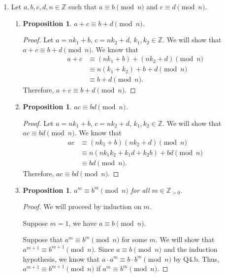 \documentclass{article}
\newtheorem{prop}[thm]{Proposition}
\begin{document}
\begin{enumerate}
\item 
Let $a,b,c,d,n \in \mathbb{Z}$ such that $a \equiv b \pmod{n}$ and $c \equiv d \pmod{n}$.
\begin{enumerate}
\item 
\begin{prop}
     $a + c \equiv b + d \pmod{n}$.
\end{prop}
\begin{proof}
    Let $a = nk_1 + b$, $c = nk_2 + d$, $k_1, k_2 \in \mathbb{Z}$. We will show that $a + c \equiv b + d \pmod{n}$. We know that 
    \begin{align}
        a + c &\equiv (nk_1 + b) + (nk_2 + d) \pmod{n} \\
              &\equiv n(k_1 + k_2) + b + d \pmod{n} \\
              &\equiv b + d \pmod{n}.
    \end{align}
    Therefore, $a + c \equiv b + d \pmod{n}$.
\end{proof}

\item 
\begin{prop}
     $ac \equiv bd \pmod{n}$.
\end{prop}
\begin{proof}
    Let $a = nk_1 + b$, $c = nk_2 + d$, $k_1, k_2 \in \mathbb{Z}$. We will show that $ac \equiv bd \pmod{n}$. We know that 
    \begin{align}
        ac &\equiv (nk_1 + b)(nk_2 + d) \pmod{n} \\
              &\equiv n(nk_1k_2 + k_1d + k_2b) + bd \pmod{n} \\
              &\equiv bd \pmod{n}.
    \end{align}
    Therefore, $ac \equiv bd \pmod{n}$.
\end{proof}

\item 
\begin{prop}
     $a^m \equiv b^m \pmod{n}$ for all $m \in \mathbb{Z}_{> 0}$.
\end{prop}
\begin{proof}
    We will proceed by induction on $m$.

    Suppose $m = 1$, we have $a \equiv b \pmod{n}$.

    Suppose that $a^m \equiv b^m \pmod{n}$ for some $m$. We will show that $a^{m+1} \equiv b^{m+1} \pmod{n}$. Since $a \equiv b \pmod{n}$ and the induction hypothesis, we know that $a\cdot a^m \equiv b\cdot b^m \pmod{n}$ by Q4.b. Thus, $a^{m+1} \equiv b^{m+1} \pmod{n}$ if $a^m \equiv b^m \pmod{n}$.


\end{proof}
\end{enumerate}
\end{enumerate}
\end{document}

